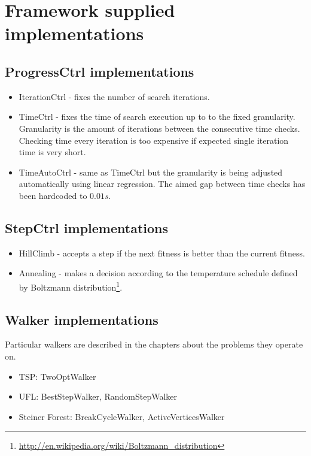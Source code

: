 \section{Framework supplied implementations}

\subsection{ProgressCtrl implementations}
\begin{itemize}
\item IterationCtrl - fixes the number of search iterations.
\item TimeCtrl - fixes the time of search execution up to to the fixed granularity.
	Granularity is the amount of iterations between the consecutive time checks.
	Checking time every iteration is too expensive if expected single iteration time
	is very short.
\item TimeAutoCtrl - same as TimeCtrl but the granularity is being adjusted
	automatically using linear regression. The aimed gap between time checks has
	been hardcoded to $0.01s$.
\end{itemize}

\subsection{StepCtrl implementations}
\begin{itemize}
\item HillClimb - accepts a step if the next fitness is better than the current fitness.
\item Annealing - makes a decision according to the temperature schedule defined by
	Boltzmann distribution\footnote{\url{http://en.wikipedia.org/wiki/Boltzmann_distribution}}.
\end{itemize}

\subsection{Walker implementations}
Particular walkers are described in the chapters about the problems they operate on.
\begin{itemize}
\item TSP: TwoOptWalker
\item UFL: BestStepWalker, RandomStepWalker
\item Steiner Forest: BreakCycleWalker, ActiveVerticesWalker
\end{itemize}

